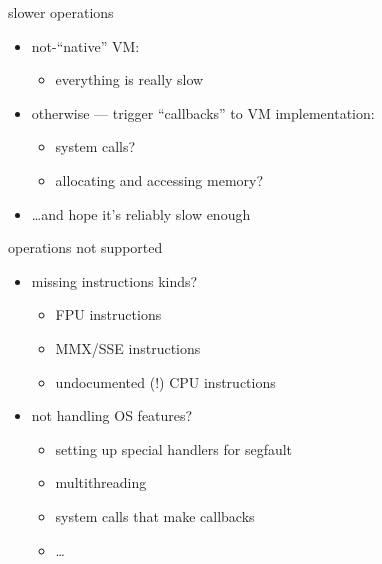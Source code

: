 
\begin{frame}{slower operations}
    \begin{itemize}
    \item not-``native'' VM:
        \begin{itemize}
        \item everything is really slow
        \end{itemize}
    \item otherwise --- trigger ``callbacks'' to VM implementation:
        \begin{itemize}
        \item system calls?
        \item allocating and accessing memory?
        \end{itemize}
    \item \ldots and hope it's reliably slow enough
    \end{itemize}
\end{frame}



\begin{frame}{operations not supported}
    \begin{itemize}
    \item missing instructions kinds?
        \begin{itemize}
        \item FPU instructions
        \item MMX/SSE instructions
        \item undocumented (!) CPU instructions
        \end{itemize}
    \item not handling OS features?
        \begin{itemize}
        \item setting up special handlers for segfault
        \item multithreading
        \item system calls that make callbacks
        \item \ldots
        \end{itemize}
    \end{itemize}
\end{frame}


